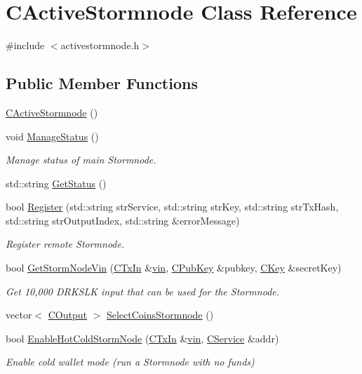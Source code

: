 \hypertarget{class_c_active_stormnode}{}\section{C\+Active\+Stormnode Class Reference}
\label{class_c_active_stormnode}


{\ttfamily \#include $<$activestormnode.\+h$>$}

\subsection*{Public Member Functions}
\begin{DoxyCompactItemize}
\item 
\hyperlink{class_c_active_stormnode_a9bc5169371b86150c909ecc8105b738d}{C\+Active\+Stormnode} ()
\item 
void \hyperlink{class_c_active_stormnode_a9532e0804ea4c96ad7d58ab3e9da6891}{Manage\+Status} ()
\begin{DoxyCompactList}\small\item\em Manage status of main Stormnode. \end{DoxyCompactList}\item 
std\+::string \hyperlink{class_c_active_stormnode_ad52331446d221f1369870dbc6d92eaa7}{Get\+Status} ()
\item 
bool \hyperlink{class_c_active_stormnode_a23b6459a057d50230f258050e9b2d6f8}{Register} (std\+::string str\+Service, std\+::string str\+Key, std\+::string str\+Tx\+Hash, std\+::string str\+Output\+Index, std\+::string \&error\+Message)
\begin{DoxyCompactList}\small\item\em Register remote Stormnode. \end{DoxyCompactList}\item 
bool \hyperlink{class_c_active_stormnode_ab0e9106269959f9a396fbf914565e326}{Get\+Storm\+Node\+Vin} (\hyperlink{class_c_tx_in}{C\+Tx\+In} \&\hyperlink{class_c_active_stormnode_aef2103b9e7fdc173e56dbb8f903e1f38}{vin}, \hyperlink{class_c_pub_key}{C\+Pub\+Key} \&pubkey, \hyperlink{class_c_key}{C\+Key} \&secret\+Key)
\begin{DoxyCompactList}\small\item\em Get 10,000 D\+R\+K\+S\+L\+K input that can be used for the Stormnode. \end{DoxyCompactList}\item 
vector$<$ \hyperlink{class_c_output}{C\+Output} $>$ \hyperlink{class_c_active_stormnode_af66060dcef7137a1db78ad72b396d741}{Select\+Coins\+Stormnode} ()
\item 
bool \hyperlink{class_c_active_stormnode_af3925fdbe649c730b215b466680c0139}{Enable\+Hot\+Cold\+Storm\+Node} (\hyperlink{class_c_tx_in}{C\+Tx\+In} \&\hyperlink{class_c_active_stormnode_aef2103b9e7fdc173e56dbb8f903e1f38}{vin}, \hyperlink{class_c_service}{C\+Service} \&addr)
\begin{DoxyCompactList}\small\item\em Enable cold wallet mode (run a Stormnode with no funds) \end{DoxyCompactList}\end{DoxyCompactItemize}
